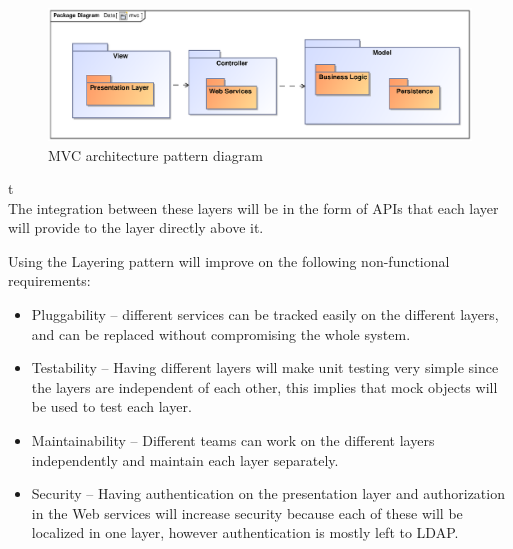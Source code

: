 \documentclass[a4paper]{article}
\begin{document}
\begin{figure}[H]                                                                                                                                               
\includegraphics[width=\textwidth]{mvc.eps}
\caption{MVC architecture pattern diagram \label{overflow}}
\end{figure}                                                        
                                                                                                                                                                                                                                                                                                                                                                                                   t
\\
                           
The integration between these layers will be in the form of APIs that each layer will provide to the layer directly above it.
                                                                                                                                      

Using the Layering pattern will improve on the following non-functional requirements:
\begin{itemize}
			\item Pluggability – different services can be tracked easily on the different layers, and can be replaced without compromising the whole system.
			\item Testability – Having different layers will make unit testing very simple since the layers are independent of each other, this implies that mock objects will be used to test each layer.
			\item Maintainability – Different teams can work on the different layers independently and maintain each layer separately.
			\item Security – Having authentication on the presentation layer and authorization in the Web services will increase security because each of these will be localized in one layer, however authentication is mostly left to LDAP.   \\[1em]
\end{itemize}
\end{document}
